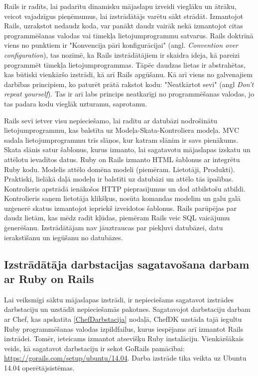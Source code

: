 Rails ir radīts, lai padarītu dinamisku mājaslapu izveidi vieglāku un ātrāku, veicot vajadzīgus pieņēmumus, lai izstrādātājs varētu sākt strādāt. Izmantojot Rails, uzrakstot nedaudz koda, var panākt daudz vairāk nekā izmantojot citas programmēšanas valodas vai tīmekļa lietojumprogrammu satvarus. Rails doktrīnā viens no punktiem ir "Konvencija pāri konfigurācijai" (angl. \textit{Convention over configuration}), tas nozīmē, ka Rails izstrādātājiem ir skaidra ideja, kā pareizi programmēt tīmekļa lietojumprogrammas. Tāpēc daudzas lietas ir abstrahētas, kas būtiski vienkāršo izstrādi, kā arī Rails apgūšanu. Kā arī viens no galvenajiem darbības principiem, ko paturēt prātā rakstot kodu: "Neatkārtot sevi" (angl \textit{Don't repeat yourself}). Tas ir arī labs princips neatkarīgi no programmēšanas valodas, jo tas padara kodu vieglāk uzturamu, saprotamu.
\cite[1.1 nodaļa]{hartlRails} \cite[getting_started]{rails-guides}

Rails sevī ietver visu nepieciešamo, lai radītu ar datubāzi nodrošinātu lietojumprogrammu, kas balstīta uz Modeļa-Skata-Kontroliera  modeļa.
MVC sadala lietojumprogrammu trīs slāņos, kur katram slānim ir savs pienākums.
Skata slānis satur šablonus, kurus izmanto, lai sagatavotu mājaslapas izskatu un attēlotu ievadītos datus. Ruby on Rails izmanto HTML šablonus ar integrētu Ruby kodu.
Modelis attēlo domēna modeli (piemēram. Lietotāji, Produkti). Praktiski, lielākā daļā modeļu ir balstīti uz datubāzi un attēlo tās īpašības.
Kontrolieris apstrādā ienākošos HTTP pieprasījumus un dod atbilstošu atbildi. Kontrolieris saņem lietotāja klikšķus, nosūta komandas modelim un galu galā uzģenerē skatus izmantojot iepriekš izveidotos šablonus.
\cite{rails-api}
Rails parūpējas par daudz lietām, kas mēdz radīt kļūdas, piemēram Rails veic SQL vaicājumu ģenerēšanu. Izstrādātājam nav jāuztraucas par piekļuvi datubāzei, datu ierakstīšanu un iegūšanu no datubāzes.

\subsection{Izstrādātāja darbstacijas sagatavošana darbam ar Ruby on Rails} \label{RubyDarbstacija}
Lai veiksmīgi sāktu mājaslapas izstrādi, ir nepieciešams sagatavot izstrādes darbstaciju un uzstādīt nepieciešamās pakotnes. Sagatavojot darbstaciju darbam ar Chef, kas apskatīta \ref{ChefDarbstacija} nodaļā, ChefDK uzstāda tajā iegultu Ruby programmēšanas valodas izpildfailus, kurus iespējams arī izmantot Rails izstrādei. Tomēr, ieteicams izmantot atsevišķu Ruby instalāciju. Vienkāršākais veids, kā sagatavot darbstaciju ir sekot GoRails pamācībai: \url{https://gorails.com/setup/ubuntu/14.04}. Darba izstrāde tika veikta uz Ubuntu 14.04 operētājsistēmas.


